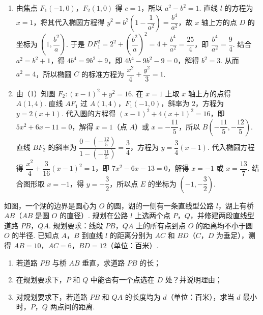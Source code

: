 \begin{solution}
\begin{enumerate}
\item 由焦点 \(F_1(-1,0)\)，\(F_2(1,0)\) 得 \(c=1\)，所以 \(a^2-b^2=1\). 直线 \(l\) 的方程为 \(x=1\)，将其代入椭圆方程得 \(y^2=b^2\left(1-\dfrac1{a^2}\right)=\dfrac{b^4}{a^2}\)，故 \(x\) 轴上方的点 \(D\) 的坐标为 \(\left(1,\dfrac{b^2}{a}\right)\). 于是 \(DF_1^2=2^2+\left(\dfrac{b^2}{a}\right)^2=4+\dfrac{b^4}{a^2}=\dfrac{25}{4}\)，即 \(\dfrac{b^4}{a^2}=\dfrac94\). 结合 \(a^2=b^2+1\)，得 \(4b^4=9b^2+9\)，即 \(4b^4-9b^2-9=0\)，解得 \(b^2=3\). 从而 \(a^2=4\)，所以椭圆 \(C\) 的标准方程为 \(\dfrac{x^2}{4}+\dfrac{y^2}{3}=1\).
\item 由（1）知圆 \(F_2:(x-1)^2+y^2=16\). 在 \(x=1\) 上取 \(x\) 轴上方的点得 \(A(1,4)\). 直线 \(AF_1\) 过 \(A(1,4)\)，\(F_1(-1,0)\)，斜率为 \(2\)，方程为 \(y=2(x+1)\). 代入圆的方程得 \((x-1)^2+4(x+1)^2=16\)，即 \(5x^2+6x-11=0\)，解得 \(x=1\)（点 \(A\)）或 \(x=-\dfrac{11}{5}\)，所以 \(B\left(-\dfrac{11}{5},-\dfrac{12}{5}\right)\). 直线 \(BF_2\) 的斜率为 \(\dfrac{0-\left(-\frac{12}{5}\right)}{1-\left(-\frac{11}{5}\right)}=\dfrac34\)，方程为 \(y=\dfrac34(x-1)\). 代入椭圆方程得 \(\dfrac{x^2}{4}+\dfrac3{16}(x-1)^2=1\)，即 \(7x^2-6x-13=0\)，解得 \(x=-1\) 或 \(x=\dfrac{13}{7}\). 结合图形取 \(x=-1\)，得 \(y=-\dfrac32\)，所以点 \(E\) 的坐标为 \(\left(-1,-\dfrac32\right)\).
\end{enumerate}
\end{solution}

\begin{problem}
如图，一个湖的边界是圆心为 \(O\) 的圆，湖的一侧有一条直线型公路 \(l\)，湖上有桥 \(AB\)（\(AB\) 是圆 \(O\) 的直径）. 规划在公路 \(l\) 上选两个点 \(P\)，\(Q\)，并修建两段直线型道路 \(PB\)，\(QA\). 规划要求：线段 \(PB\)，\(QA\) 上的所有点到点 \(O\) 的距离均不小于圆 \(O\) 的半径. 已知点 \(A\)，\(B\) 到直线 \(l\) 的距离分别为 \(AC\) 和 \(BD\)（\(C\)，\(D\) 为垂足），测得 \(AB=10\)，\(AC=6\)，\(BD=12\)（单位：百米）.

\begin{enumerate}
\item 若道路 \(PB\) 与桥 \(AB\) 垂直，求道路 \(PB\) 的长；
\item 在规划要求下，\(P\) 和 \(Q\) 中能否有一个点选在 \(D\) 处？并说明理由；
\item 对规划要求下，若道路 \(PB\) 和 \(QA\) 的长度均为 \(d\)（单位：百米），求当 \(d\) 最小时，\(P\)，\(Q\) 两点间的距离.
\end{enumerate}


\end{problem}

